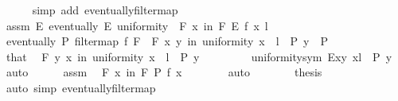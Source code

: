 \begin{isabellebody}
\ \ \ \ \isamarkupfalse%
\ {\isacharparenleft}{\kern0pt}simp\ add{\isacharcolon}{\kern0pt}\ eventually{\isacharunderscore}{\kern0pt}filtermap{\isacharparenright}{\kern0pt}\isanewline
{}\isamarkupfalse%
\isanewline
\ \ \isamarkupfalse%
\ assm{\isacharcolon}{\kern0pt}\ {\isacartoucheopen}{\isasymforall}E{\isachardot}{\kern0pt}\ eventually\ E\ uniformity\ {\isasymlongrightarrow}\ {\isacharparenleft}{\kern0pt}{\isasymforall}\isactrlsub F\ x\ in\ F{\isachardot}{\kern0pt}\ E\ {\isacharparenleft}{\kern0pt}f\ x{\isacharcomma}{\kern0pt}\ l{\isacharparenright}{\kern0pt}{\isacharparenright}{\kern0pt}{\isacartoucheclose}\isanewline
\ \ \isamarkupfalse%
\ {\isacartoucheopen}eventually\ P\ {\isacharparenleft}{\kern0pt}filtermap\ f\ F{\isacharparenright}{\kern0pt}{\isacartoucheclose}\ \ {\isacartoucheopen}{\isasymforall}\isactrlsub F\ {\isacharparenleft}{\kern0pt}x{\isacharcomma}{\kern0pt}\ y{\isacharparenright}{\kern0pt}\ in\ uniformity{\isachardot}{\kern0pt}\ x\ {\isacharequal}{\kern0pt}\ l\ {\isasymlongrightarrow}\ P\ y{\isacartoucheclose}\ \ P\isanewline
\ \ \isamarkupfalse%
\ {\isacharminus}{\kern0pt}\isanewline
\ \ \ \ \isamarkupfalse%
\ that\ \isamarkupfalse%
\ {\isacartoucheopen}{\isasymforall}\isactrlsub F\ {\isacharparenleft}{\kern0pt}y{\isacharcomma}{\kern0pt}\ x{\isacharparenright}{\kern0pt}\ in\ uniformity{\isachardot}{\kern0pt}\ x\ {\isacharequal}{\kern0pt}\ l\ {\isasymlongrightarrow}\ P\ y{\isacartoucheclose}\ \isanewline
\ \ \ \ \ \ \isamarkupfalse%
\ uniformity{\isacharunderscore}{\kern0pt}sym{\isacharbrackleft}{\kern0pt}\ E{\isacharequal}{\kern0pt}{\isacartoucheopen}{\isasymlambda}{\isacharparenleft}{\kern0pt}x{\isacharcomma}{\kern0pt}y{\isacharparenright}{\kern0pt}{\isachardot}{\kern0pt}\ x{\isacharequal}{\kern0pt}l\ {\isasymlongrightarrow}\ P\ y{\isacartoucheclose}{\isacharbrackright}{\kern0pt}\ \isamarkupfalse%
\ auto\isanewline
\ \ \ \ \isamarkupfalse%
\ assm\ \isamarkupfalse%
\ {\isacartoucheopen}{\isasymforall}\isactrlsub F\ x\ in\ F{\isachardot}{\kern0pt}\ P\ {\isacharparenleft}{\kern0pt}f\ x{\isacharparenright}{\kern0pt}{\isacartoucheclose}\isanewline
\ \ \ \ \ \ \isamarkupfalse%
\ auto\isanewline
\ \ \ \ \isamarkupfalse%
\ \isamarkupfalse%
\ {\isacharquery}{\kern0pt}thesis\isanewline
\ \ \ \ \ \ \isamarkupfalse%
\ {\isacharparenleft}{\kern0pt}auto\ simp{\isacharcolon}{\kern0pt}\ eventually{\isacharunderscore}{\kern0pt}filtermap{\isacharparenright}{\kern0pt}\isanewline

\end{isabellebody}
